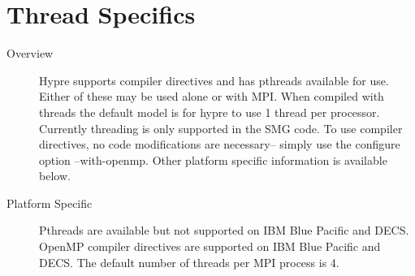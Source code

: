 \section{Thread Specifics}

\begin{description}
\item[Overview]
Hypre supports compiler directives and has pthreads available for use.  Either of these may be
used alone or with MPI.  When compiled with threads the default model is for 
hypre to use 1 thread per processor.  Currently threading is only supported
in the SMG code.  To use compiler directives, no code modifications are necessary-- simply use the configure option --with-openmp.  
Other platform specific information 
is available below.

\item[Platform Specific]
Pthreads are available but not supported on IBM Blue Pacific and DECS.  OpenMP compiler 
directives are supported on IBM Blue Pacific and DECS.  The default number of
threads per MPI process is 4. 
\end{description}    